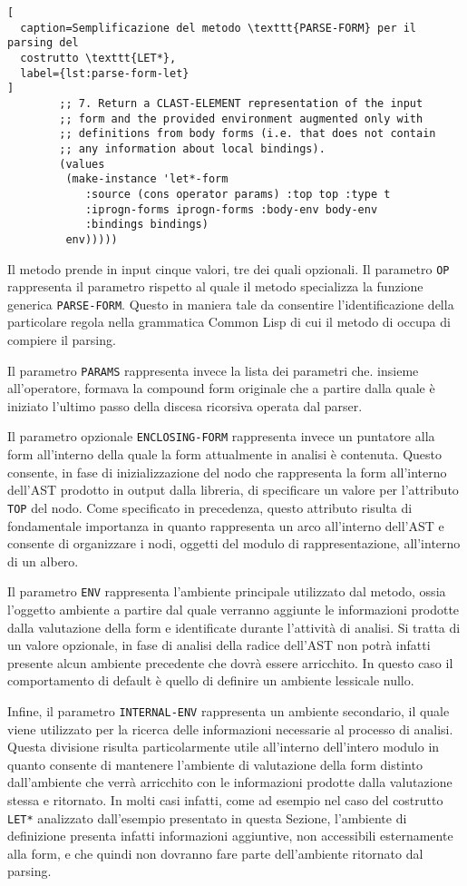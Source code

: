 \begin{lstlisting}[
  caption=Semplificazione del metodo \texttt{PARSE-FORM} per il parsing del
  costrutto \texttt{LET*},
  label={lst:parse-form-let}
]
        ;; 7. Return a CLAST-ELEMENT representation of the input
        ;; form and the provided environment augmented only with
        ;; definitions from body forms (i.e. that does not contain
        ;; any information about local bindings).
        (values
         (make-instance 'let*-form
            :source (cons operator params) :top top :type t
            :iprogn-forms iprogn-forms :body-env body-env
            :bindings bindings)
         env)))))

\end{lstlisting}

Il metodo prende in input cinque valori, tre dei quali opzionali. Il parametro
\texttt{OP} rappresenta il parametro rispetto al quale il metodo specializza la
funzione generica \texttt{PARSE-FORM}. Questo in maniera tale da consentire
l'identificazione della particolare regola nella grammatica Common Lisp di cui
il metodo di occupa di compiere il parsing.

Il parametro \texttt{PARAMS} rappresenta invece la lista dei parametri che.
insieme all'operatore, formava la compound form originale che a partire dalla
quale è iniziato l'ultimo passo della discesa ricorsiva operata dal parser.

Il parametro opzionale \texttt{ENCLOSING-FORM} rappresenta invece un puntatore
alla form all'interno della quale la form attualmente in analisi è contenuta.
Questo consente, in fase di inizializzazione del nodo che rappresenta la form
all'interno dell'AST prodotto in output dalla libreria, di specificare un valore
per l'attributo \texttt{TOP} del nodo. Come specificato in precedenza, questo
attributo risulta di fondamentale importanza in quanto rappresenta un arco
all'interno dell'AST e consente di organizzare i nodi, oggetti del modulo di
rappresentazione, all'interno di un albero.

Il parametro \texttt{ENV} rappresenta l'ambiente principale utilizzato dal
metodo, ossia l'oggetto ambiente a partire dal quale verranno aggiunte le
informazioni prodotte dalla valutazione della form e identificate durante
l'attività di analisi. Si tratta di un valore opzionale, in fase di analisi
della radice dell'AST non potrà infatti presente alcun ambiente precedente che
dovrà essere arricchito. In questo caso il comportamento di default è quello di
definire un ambiente lessicale nullo.

Infine, il parametro \texttt{INTERNAL-ENV} rappresenta un ambiente secondario,
il quale viene utilizzato per la ricerca delle informazioni necessarie al
processo di analisi. Questa divisione risulta particolarmente utile all'interno
dell'intero modulo in quanto consente di mantenere l'ambiente di valutazione
della form distinto dall'ambiente che verrà arricchito con le informazioni
prodotte dalla valutazione stessa e ritornato. In molti casi infatti, come ad
esempio nel caso del costrutto \texttt{LET*} analizzato dall'esempio presentato
in questa Sezione, l'ambiente di definizione presenta infatti informazioni
aggiuntive, non accessibili esternamente alla form, e che quindi non dovranno
fare parte dell'ambiente ritornato dal parsing.

